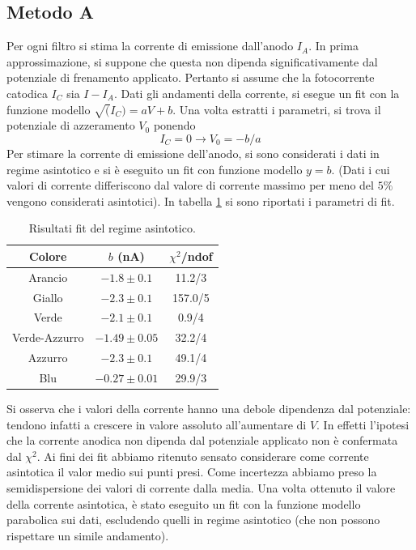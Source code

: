 \documentclass[10pt,a4paper]{article}
\begin{document}
\subsection{Metodo A}
Per ogni filtro si stima la corrente di emissione dall'anodo $I_A$. In prima approssimazione, si suppone che questa non dipenda significativamente dal potenziale di frenamento applicato. Pertanto si assume che la fotocorrente catodica $I_{C}$ sia $I-I_A$. 
Dati gli andamenti della corrente, si esegue un fit con la funzione modello $\sqrt(I_C)=aV +b$.
Una volta estratti i parametri, si trova il potenziale di azzeramento $V_0$ ponendo 
\begin{equation}\label{eq:v0parabola}
I_{C}=0\rightarrow V_0=-b/a
\end{equation}
Per stimare la corrente di emissione dell'anodo, si sono considerati i dati in regime asintotico e si è eseguito un fit con funzione modello $y = b$.
(Dati i cui valori di corrente differiscono dal valore di corrente massimo per meno del $5\%$ vengono considerati asintotici).
In tabella \ref{tab:asintotico} si sono riportati i parametri di fit.
\begin{table}[!htb]
\centering
\begin{tabular}{|c|c|c|}
\hline
Colore & $b$ (nA) & $\chi ^2 $/ndof\\
\hline
Arancio & $-1.8\pm0.1$ & 11.2/3\\
\hline
Giallo & $-2.3\pm 0.1$ & 157.0/5\\
\hline
Verde & $-2.1\pm 0.1$ & 0.9/4\\
\hline
Verde-Azzurro & $-1.49\pm 0.05$ & 32.2/4\\
\hline
Azzurro & $-2.3 \pm 0.1$ & 49.1/4\\
\hline
Blu & $-0.27\pm0.01$ & 29.9/3\\
\hline
\end{tabular}
\caption{Risultati fit del regime asintotico.\label{tab:asintotico}}
\end{table}
Si osserva che i valori della corrente hanno una debole dipendenza dal potenziale: tendono infatti a crescere in valore assoluto all'aumentare di $V$.
In effetti l'ipotesi che la corrente anodica non dipenda dal potenziale applicato non è confermata dal $\chi ^2$.
Ai fini dei fit abbiamo ritenuto sensato considerare come corrente asintotica il valor medio sui punti presi.
Come incertezza abbiamo preso la semidispersione dei valori di corrente dalla media.%
Una volta ottenuto il valore della corrente asintotica, è stato eseguito un fit con la funzione modello parabolica sui dati, escludendo quelli in regime asintotico (che non possono rispettare un simile andamento).
\end{document}
